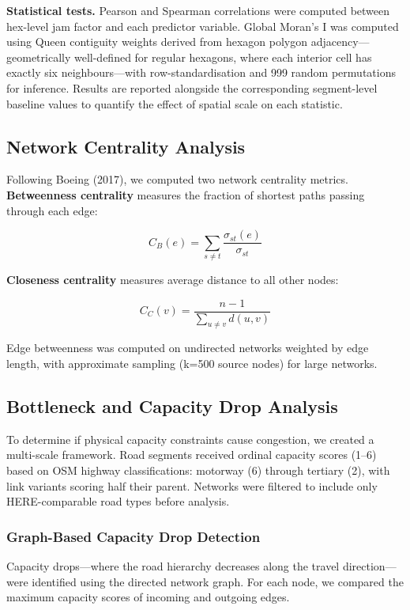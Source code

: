 \documentclass[12pt,a4paper]{article}
\begin{document}
\textbf{Statistical tests.} Pearson and Spearman correlations were computed between hex-level jam factor and each predictor variable. Global Moran's I was computed using Queen contiguity weights derived from hexagon polygon adjacency---geometrically well-defined for regular hexagons, where each interior cell has exactly six neighbours---with row-standardisation and 999 random permutations for inference. Results are reported alongside the corresponding segment-level baseline values to quantify the effect of spatial scale on each statistic.

\subsection{Network Centrality Analysis}

Following Boeing (2017), we computed two network centrality metrics. \textbf{Betweenness centrality} measures the fraction of shortest paths passing through each edge:

\[C_B(e) = \sum_{s \neq t} \frac{\sigma_{st}(e)}{\sigma_{st}}\]

\textbf{Closeness centrality} measures average distance to all other nodes:

\[C_C(v) = \frac{n-1}{\sum_{u \neq v} d(u,v)}\]

Edge betweenness was computed on undirected networks weighted by edge length, with approximate sampling (k=500 source nodes) for large networks.

\subsection{Bottleneck and Capacity Drop Analysis}

To determine if physical capacity constraints cause congestion, we created a multi-scale framework. Road segments received ordinal capacity scores (1–6) based on OSM highway classifications: motorway (6) through tertiary (2), with link variants scoring half their parent. Networks were filtered to include only HERE-comparable road types before analysis.

\subsubsection{Graph-Based Capacity Drop Detection}

Capacity drops—where the road hierarchy decreases along the travel direction—were identified using the directed network graph. For each node, we compared the maximum capacity scores of incoming and outgoing edges.
\end{document}

